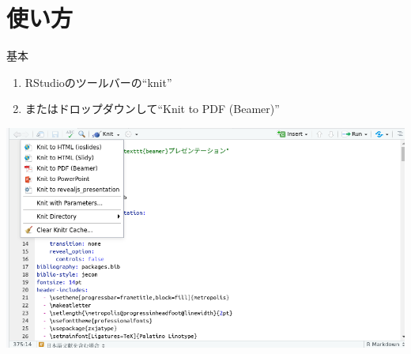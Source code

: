 \documentclass[
  14pt,
  ignorenonframetext,
]{beamer}
\providecommand{\tightlist}{%
  \setlength{\itemsep}{0pt}\setlength{\parskip}{0pt}}
\begin{document}
\hypertarget{ux4f7fux3044ux65b9}{%
\section{使い方}\label{ux4f7fux3044ux65b9}}

\begin{frame}{基本}
\protect\hypertarget{ux57faux672c}{}

\begin{enumerate}
\tightlist
\item
  RStudioのツールバーの``knit''
\item
  またはドロップダウンして``Knit to PDF (Beamer)''
\end{enumerate}

\begin{center}\includegraphics[width=0.9\linewidth]{img/render} \end{center}

\end{frame}
\end{document}

